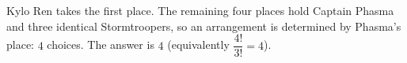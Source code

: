 Kylo Ren takes the first place. The remaining four places hold Captain Phasma and three identical Stormtroopers, so an arrangement is determined by Phasma's place: $4$ choices. The answer is $\boxed{4}$ (equivalently $\dfrac{4!}{3!}=4$).
